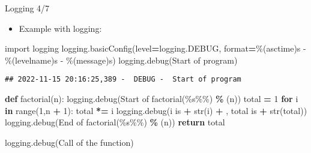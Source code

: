 \documentclass[
  8pt,
  ignorenonframetext,
]{beamer}
\newenvironment{Shaded}{\begin{snugshade}}{\end{snugshade}}
\newcommand{\BuiltInTok}[1]{#1}
\newcommand{\ControlFlowTok}[1]{\textcolor[rgb]{0.13,0.29,0.53}{\textbf{#1}}}
\newcommand{\DecValTok}[1]{\textcolor[rgb]{0.00,0.00,0.81}{#1}}
\newcommand{\ImportTok}[1]{#1}
\newcommand{\KeywordTok}[1]{\textcolor[rgb]{0.13,0.29,0.53}{\textbf{#1}}}
\newcommand{\NormalTok}[1]{#1}
\newcommand{\OperatorTok}[1]{\textcolor[rgb]{0.81,0.36,0.00}{\textbf{#1}}}
\newcommand{\SpecialCharTok}[1]{\textcolor[rgb]{0.00,0.00,0.00}{#1}}
\newcommand{\StringTok}[1]{\textcolor[rgb]{0.31,0.60,0.02}{#1}}
\providecommand{\tightlist}{%
  \setlength{\itemsep}{0pt}\setlength{\parskip}{0pt}}
\begin{document}
\begin{frame}[fragile]{Logging 4/7}
\protect\hypertarget{logging-47}{}
\begin{itemize}
\tightlist
\item
  Example with logging:
\end{itemize}

\begin{Shaded}
\begin{Highlighting}[]
\ImportTok{import}\NormalTok{ logging}
\NormalTok{logging.basicConfig(level}\OperatorTok{=}\NormalTok{logging.DEBUG, }\BuiltInTok{format}\OperatorTok{=}\StringTok{\textquotesingle{}}\SpecialCharTok{\%(asctime)s}\StringTok{ {-}  }\SpecialCharTok{\%(levelname)s}\StringTok{ {-}  }\SpecialCharTok{\%(message)s}\StringTok{\textquotesingle{}}\NormalTok{)}
\NormalTok{logging.debug(}\StringTok{\textquotesingle{}Start of program\textquotesingle{}}\NormalTok{)}
\end{Highlighting}
\end{Shaded}

\begin{verbatim}
## 2022-11-15 20:16:25,389 -  DEBUG -  Start of program
\end{verbatim}

\begin{Shaded}
\begin{Highlighting}[]
\KeywordTok{def}\NormalTok{ factorial(n):}
\NormalTok{    logging.debug(}\StringTok{\textquotesingle{}Start of factorial(}\SpecialCharTok{\%s\%\%}\StringTok{)\textquotesingle{}}  \OperatorTok{\%}\NormalTok{ (n))}
\NormalTok{    total }\OperatorTok{=} \DecValTok{1}
    \ControlFlowTok{for}\NormalTok{ i }\KeywordTok{in} \BuiltInTok{range}\NormalTok{(}\DecValTok{1}\NormalTok{,n }\OperatorTok{+} \DecValTok{1}\NormalTok{):}
\NormalTok{        total }\OperatorTok{*=}\NormalTok{ i}
\NormalTok{        logging.debug(}\StringTok{\textquotesingle{}i is \textquotesingle{}} \OperatorTok{+} \BuiltInTok{str}\NormalTok{(i) }\OperatorTok{+} \StringTok{\textquotesingle{}, total is \textquotesingle{}} \OperatorTok{+} \BuiltInTok{str}\NormalTok{(total))}
\NormalTok{    logging.debug(}\StringTok{\textquotesingle{}End of factorial(}\SpecialCharTok{\%s\%\%}\StringTok{)\textquotesingle{}}  \OperatorTok{\%}\NormalTok{ (n))}
    \ControlFlowTok{return}\NormalTok{ total}

\NormalTok{logging.debug(}\StringTok{\textquotesingle{}Call of the function\textquotesingle{}}\NormalTok{)}
\end{Highlighting}
\end{Shaded}


\end{frame}
\end{document}
